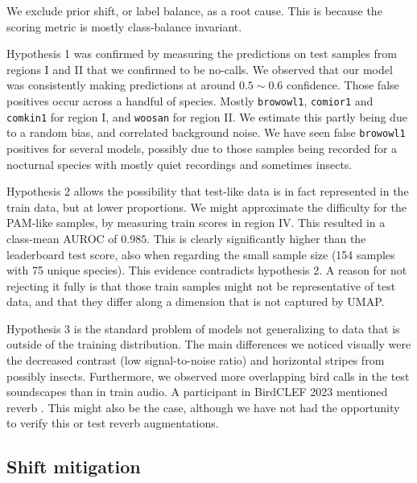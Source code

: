 We exclude prior shift, or label balance, as a root cause. This is because the scoring metric is mostly class-balance invariant.

Hypothesis 1 was confirmed by measuring the predictions on test samples from regions I and II that we confirmed to be no-calls. We observed that our model was consistently making predictions at around $0.5 \sim 0.6$ confidence. Those false positives occur across a handful of species. Mostly \texttt{browowl1}, \texttt{comior1} and \texttt{comkin1} for region I, and \texttt{woosan} for region II. We estimate this partly being due to a random bias, and correlated background noise. We have seen false \texttt{browowl1} positives for several models, possibly due to those samples being recorded for a nocturnal species with mostly quiet recordings and sometimes insects.

Hypothesis 2 allows the possibility that test-like data is in fact represented in the train data, but at lower proportions. We might approximate the difficulty for the PAM-like samples, by measuring train scores in region IV. This resulted in a class-mean AUROC of $0.985$. This is clearly significantly higher than the leaderboard test score, also when regarding the small sample size (154 samples with 75 unique species). This evidence contradicts hypothesis 2. A reason for not rejecting it fully is that those train samples might not be representative of test data, and that they differ along a dimension that is not captured by UMAP. 

Hypothesis 3 is the standard problem of models not generalizing to data that is outside of the training distribution. The main differences we noticed visually were the decreased contrast (low signal-to-noise ratio) and horizontal stripes from possibly insects. Furthermore, we observed more overlapping bird calls in the test soundscapes than in train audio. A participant in BirdCLEF 2023 mentioned reverb \cite{LASSECK2023}. This might also be the case, although we have not had the opportunity to verify this or test reverb augmentations.


\subsection{Shift mitigation}

